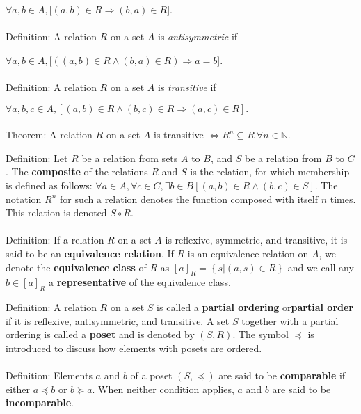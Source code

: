 \documentclass[a4paper,10pt]{report}
\begin{document}
$\forall a,b\in A, [(a,b)\in R \Rightarrow (b,a)\in R$]. \\ \\

Definition: A relation $R$ on a set $A$ is \textit{antisymmetric} if

$\forall a,b\in A, [((a,b)\in R \land (b,a)\in R) \Rightarrow a=b$].\\ \\

Definition: A relation $R$ on a set $A$ is \textit{transitive} if

$\forall a,b,c\in A, [(a,b)\in R \land (b,c)\in R \Rightarrow (a,c)\in R].$ \\ \\

Theorem: A relation $R$ on a set $A$ is transitive $\iff R^n\subseteq R ~\forall n\in \mathbb{N}.$

Definition: Let $R$ be a relation from sets $A$ to $B$, and $S$ be a relation from $B$ to $C$. The \textbf{composite} of the relations $R$ and $S$ is the relation, for which membership is defined as follows:
$\forall a\in A, \forall c\in C, \exists b\in B [(a,b)\in R \land (b,c)\in S]$. The notation $R^n$ for such a relation denotes the function composed with itself $n$ times. This relation is denoted $S\circ R$.
\\ \\

Definition: If a relation $R$ on a set $A$ is reflexive, symmetric, and transitive, it is said to be an \textbf{equivalence relation}. If $R$ is an equivalence relation on $A$, we denote the \textbf{equivalence class} of $R$ as $[a]_R = \left\{s | (a,s) \in R\right\}$ and we call any $b \in [a]_R$ a \textbf{representative} of the equivalence class.

Definition: A relation $R$ on a set $S$ is called a \textbf{partial ordering} or\textbf{partial order} if it is reflexive, antisymmetric, and transitive. A set $S$ together with a partial ordering is called a \textbf{poset} and is denoted by $(S,R)$. The symbol $\preccurlyeq$ is introduced to discuss how elements with posets are ordered. \\ \\

Definition: Elements $a$ and $b$ of a poset $(S, \preccurlyeq)$ are said to be \textbf{comparable} if either $a\preccurlyeq b$ or $b\succcurlyeq a$. When neither condition applies, $a$ and $b$ are said to be \textbf{incomparable}. \\ \\
\end{document}
